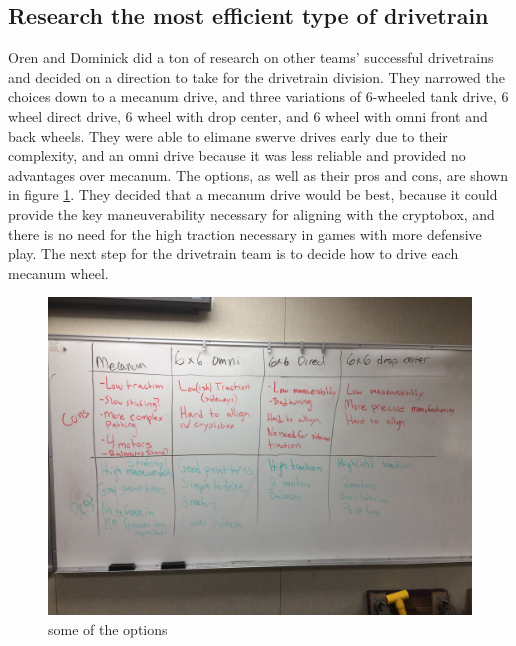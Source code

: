 \documentclass{article}
\begin{document}
\subsection{Research the most efficient type of drivetrain}
Oren and Dominick did a ton of research on other teams' successful drivetrains and decided on a direction to take for the drivetrain division. They narrowed the choices down to a mecanum drive, and three variations of 6-wheeled tank drive, 6 wheel direct drive, 6 wheel with drop center, and 6 wheel with omni front and back wheels. They were able to elimane swerve drives early due to their complexity, and an omni drive because it was less reliable and provided no advantages over mecanum. The options, as well as their pros and cons, are shown in figure \ref{fig:options}. They decided that a mecanum drive would be best, because it could provide the key maneuverability necessary for aligning with the cryptobox, and there is no need for the high traction necessary in games with more defensive play. The next step for the drivetrain team is to decide how to drive each mecanum wheel.
\begin{figure}[h]
    \centering
    \includegraphics[width=.6\textwidth]{02/images/options.jpg}
    \caption{some of the options}
    \label{fig:options}
\end{figure}
\end{document}
